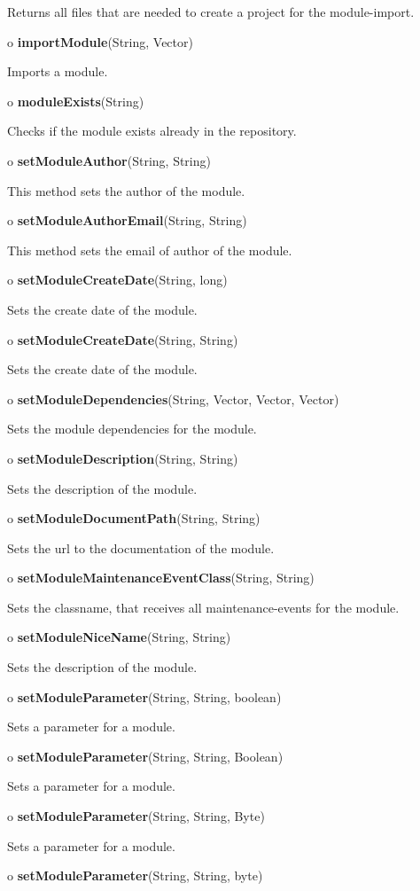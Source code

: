 \begin{description}
Returns all files that are needed to create a project for the module-import.  
\item o {\bf importModule}(String, Vector)  

Imports a module.  
\item o {\bf moduleExists}(String)  

Checks if the module exists already in the repository.  
\item o {\bf setModuleAuthor}(String, String)  

This method sets the author of the module.  
\item o {\bf setModuleAuthorEmail}(String, String)  

This method sets the email of author of the module.  
\item o {\bf setModuleCreateDate}(String, long)  

Sets the create date of the module.  
\item o {\bf setModuleCreateDate}(String, String)  

Sets the create date of the module.  
\item o {\bf setModuleDependencies}(String, Vector, Vector, Vector)  

Sets the module dependencies for the module.  
\item o {\bf setModuleDescription}(String, String)  

Sets the description of the module.  
\item o {\bf setModuleDocumentPath}(String, String)  

Sets the url to the documentation of the module.  
\item o {\bf setModuleMaintenanceEventClass}(String, String)  

Sets the classname, that receives all maintenance-events for the module.  
\item o {\bf setModuleNiceName}(String, String)  

Sets the description of the module.  
\item o {\bf setModuleParameter}(String, String, boolean)  

Sets a parameter for a module.  
\item o {\bf setModuleParameter}(String, String, Boolean)  

Sets a parameter for a module.  
\item o {\bf setModuleParameter}(String, String, Byte)  

Sets a parameter for a module.  
\item o {\bf setModuleParameter}(String, String, byte)  


\end{description}
